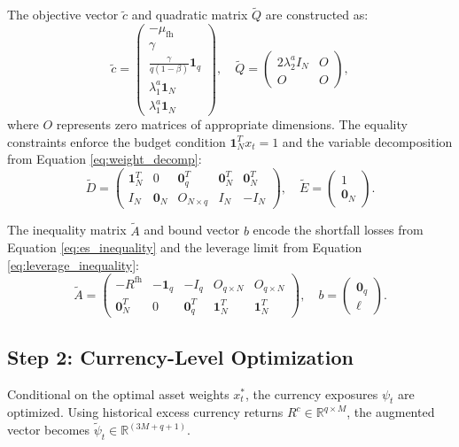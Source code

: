 The objective vector $\tilde{c}$ and quadratic matrix $\tilde{Q}$ are constructed as:
\begin{equation*}
    \tilde{c} = \begin{pmatrix} -\mu_{\text{fh}} \\ \gamma \\ \frac{\gamma}{q(1-\beta)} \mathbf{1}_q \\ \lambda_1^a \mathbf{1}_N \\ \lambda_1^a \mathbf{1}_N \end{pmatrix}, \quad 
    \tilde{Q} = \begin{pmatrix} 2\lambda_2^a I_N & O \\ O & O \end{pmatrix},
\end{equation*}
where $O$ represents zero matrices of appropriate dimensions. The equality constraints enforce the budget condition $\mathbf{1}_N^T x_t = 1$ and the variable decomposition from Equation \ref{eq:weight_decomp}:
\begin{equation*}
    \tilde{D} = \begin{pmatrix} 
    \mathbf{1}_N^T & 0 & \mathbf{0}_q^T & \mathbf{0}_N^T & \mathbf{0}_N^T \\ 
    I_N & \mathbf{0}_N & O_{N \times q} & I_N & -I_N 
    \end{pmatrix}, \quad 
    \tilde{E} = \begin{pmatrix} 1 \\ \mathbf{0}_N \end{pmatrix}.
\end{equation*}

The inequality matrix $\tilde{A}$ and bound vector $b$ encode the shortfall losses from Equation \ref{eq:es_inequality} and the leverage limit from Equation \ref{eq:leverage_inequality}:
\begin{equation*}
    \tilde{A} = \begin{pmatrix} 
    -R^{\text{fh}} & -\mathbf{1}_q & -I_q & O_{q \times N} & O_{q \times N} \\
    \mathbf{0}_N^T & 0 & \mathbf{0}_q^T & \mathbf{1}_N^T & \mathbf{1}_N^T 
    \end{pmatrix}, \quad 
    b = \begin{pmatrix} \mathbf{0}_q \\ \ell \end{pmatrix}.
\end{equation*}

\subsection{Step 2: Currency-Level Optimization}
Conditional on the optimal asset weights $x_t^*$, the currency exposures $\psi_t$ are optimized. Using historical excess currency returns $R^c \in \mathbb{R}^{q \times M}$, the augmented vector becomes $\tilde{\psi}_t \in \mathbb{R}^{(3M + q + 1)}$.

